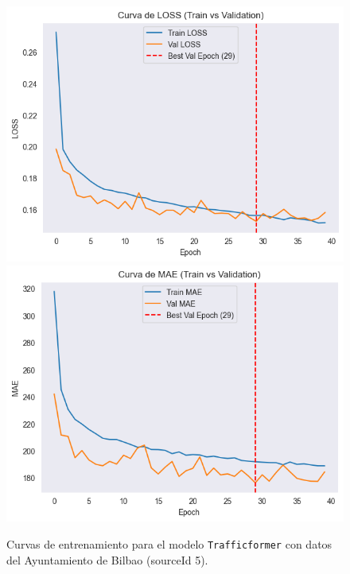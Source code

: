 \begin{figure}[H]
	\centering
	\caption{Curvas de entrenamiento para el modelo \texttt{Trafficformer} con datos del Ayuntamiento de Bilbao (sourceId 5).}
	\begin{minipage}{0.48\textwidth}
		\centering
		\includegraphics[width=\linewidth]{includes/cap5/graphs/sid5_trafficformer_loss.png}
		\vspace{0.2cm}
		\includegraphics[width=\linewidth]{includes/cap5/graphs/sid5_trafficformer_mae.png}
		\vspace{0.2cm}

\end{minipage}
\end{figure}
